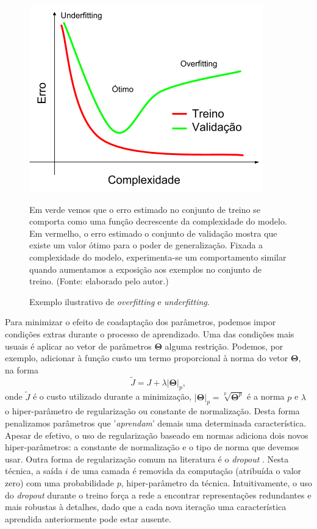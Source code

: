 \begin{figure}[ht]
	\caption{Exemplo ilustrativo de \textit{overfitting} e \textit{underfitting}.}
 	\begin{center}
	\includegraphics[width=.6\linewidth]{figuras/overfitting.png}
	\end{center}
	\small Em verde vemos que o erro estimado no conjunto de treino se comporta como uma função decrescente da complexidade do modelo. Em vermelho, o erro estimado o conjunto de validação mostra que existe um valor ótimo para o poder de generalização. Fixada a complexidade do modelo, experimenta-se um comportamento similar quando aumentamos a exposição aos exemplos no conjunto de treino. (Fonte: elaborado pelo autor.)
	\label{overfit}
\end{figure}

Para minimizar o efeito de coadaptação dos parâmetros, podemos impor condições extras durante o processo de aprendizado. Uma das condições mais usuais é aplicar ao vetor de parâmetros $\mathbf{\Theta}$ alguma restrição. Podemos, por exemplo, adicionar à função custo um termo proporcional à norma do vetor $\mathbf{\Theta}$, na forma
\begin{equation}
\tilde{J} = J + \lambda \left| \mathbf{\Theta} \right|_p,
\end{equation}
onde $\tilde{J}$ é o custo utilizado durante a minimização, $\left| \mathbf{\Theta} \right|_p = \sqrt[p]{\mathbf{\Theta}^p}$ é a norma $p$ e $\lambda$ o hiper-parâmetro de regularização ou constante de normalização. Desta forma penalizamos parâmetros que '\textit{aprendam}' demais uma determinada característica. Apesar de efetivo, o uso de regularização baseado em normas adiciona dois novos hiper-parâmetros: a constante de normalização e o tipo de norma que devemos usar. Outra forma de regularização comum na literatura é o \textit{dropout} \cite{hinton2012improving}. Nesta técnica, a saída $i$ de uma camada é removida da computação (atribuída o valor zero) com uma probabilidade $p$, hiper-parâmetro da técnica. Intuitivamente, o uso do \textit{dropout} durante o treino força a rede a encontrar representações redundantes e mais robustas à detalhes, dado que a cada nova iteração uma característica aprendida anteriormente pode estar ausente.

